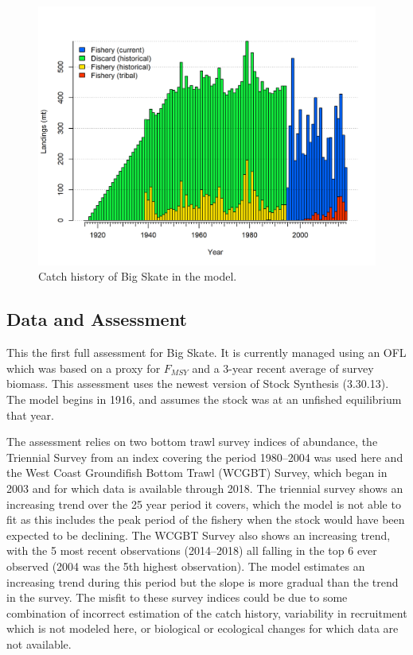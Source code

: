 \documentclass[12pt,]{article}
\begin{document}
\begin{figure}
\centering
\includegraphics{r4ss/plots_mod1/catch2 landings stacked.png}
\caption{Catch history of Big Skate in the model.
\label{fig:r4ss_catches}}
\end{figure}

\FloatBarrier

\newpage

\hypertarget{data-and-assessment}{%
\subsection*{Data and Assessment}\label{data-and-assessment}}

This the first full assessment for Big Skate. It is currently managed
using an OFL which was based on a proxy for \(F_{MSY}\) and a 3-year
recent average of survey biomass. This assessment uses the newest
version of Stock Synthesis (3.30.13). The model begins in 1916, and
assumes the stock was at an unfished equilibrium that year.

The assessment relies on two bottom trawl survey indices of abundance,
the Triennial Survey from an index covering the period 1980--2004 was
used here and the West Coast Groundifish Bottom Trawl (WCGBT) Survey,
which began in 2003 and for which data is available through 2018. The
triennial survey shows an increasing trend over the 25 year period it
covers, which the model is not able to fit as this includes the peak
period of the fishery when the stock would have been expected to be
declining. The WCGBT Survey also shows an increasing trend, with the 5
most recent observations (2014--2018) all falling in the top 6 ever
observed (2004 was the 5th highest observation). The model estimates an
increasing trend during this period but the slope is more gradual than
the trend in the survey. The misfit to these survey indices could be due
to some combination of incorrect estimation of the catch history,
variability in recruitment which is not modeled here, or biological or
ecological changes for which data are not available.
\end{document}
